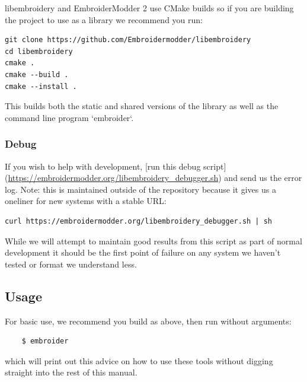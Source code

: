 \documentclass[a4paper, 11pt]{report}
\begin{document}
libembroidery and EmbroiderModder 2 use CMake builds
so if you are building the project to use as a library we recommend
you run:
 
\begin{verbatim}
git clone https://github.com/Embroidermodder/libembroidery
cd libembroidery
cmake .
cmake --build .
cmake --install .
\end{verbatim}

This builds both the static and shared versions of the library as well
as the command line program `embroider`.

\subsubsection{Debug}

If you wish to help with development, [run this debug script](\url{https://embroidermodder.org/libembroidery_debugger.sh}) and send us the error log. Note: this is maintained outside of the repository because it gives us a oneliner for new systems with a stable URL:

\begin{verbatim}
curl https://embroidermodder.org/libembroidery_debugger.sh | sh
\end{verbatim}

While we will attempt to maintain good results from this script as part of normal development it should be the first point of failure on any system we haven't tested or format we understand less.

\subsection{Usage}

For basic use, we recommend you build as above, then run without arguments:

\begin{verbatim}
    $ embroider
\end{verbatim}

which will print out this advice on how to use these tools without digging straight into the rest of this manual.
\end{document}

